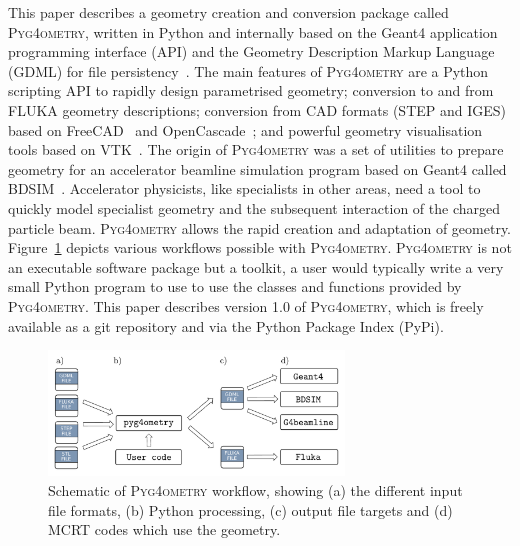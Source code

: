 \documentclass[final,5p,times,twocolumn]{elsarticle}
\newcommand{\PYGEOMETRY}{\textsc{Pyg4ometry}}
\begin{document}
This paper describes a geometry creation and conversion package called \PYGEOMETRY{}, written in Python and internally based on the Geant4 application 
programming interface (API) and the Geometry Description Markup Language (GDML) for file persistency~\cite{GDML}. The main features of \PYGEOMETRY{} 
are a Python scripting API to rapidly design parametrised geometry; conversion to and from  FLUKA geometry descriptions; conversion from CAD formats  (STEP 
and IGES) based on FreeCAD~\cite{FreeCAD} and OpenCascade~\cite{OpenCASCADE}; and powerful geometry visualisation tools based on VTK~\cite{VTK4}. The 
origin of \PYGEOMETRY{} was a set of utilities to prepare geometry for an accelerator beamline simulation program based on Geant4 called BDSIM~\cite{BDSIM_Nevay}. 
Accelerator physicists, like specialists in other areas, need a tool to quickly model specialist geometry and the subsequent interaction of the charged particle beam. 
\PYGEOMETRY{} allows the rapid creation and adaptation of geometry. Figure~\ref{fig:workflow} depicts various workflows possible with \PYGEOMETRY{}. \PYGEOMETRY{} 
is not an executable software package but a toolkit, a user would typically write a very small Python program to use to use the classes and functions provided by 
\PYGEOMETRY{}. This paper describes version 1.0 of \PYGEOMETRY{}, which is freely available as a git repository and via the Python Package Index (PyPi).

\begin{figure}[hbt!]
  \normalsize
  \centering
  \includegraphics[width=0.7\textwidth]{./diagrams/workflow.pdf}
  \caption{\label{fig:workflow}Schematic of \PYGEOMETRY{} workflow, showing (a) the different input file formats, (b) Python processing, (c) output file targets and 
  (d) MCRT codes which use the geometry. }
\end{figure}
\end{document}
